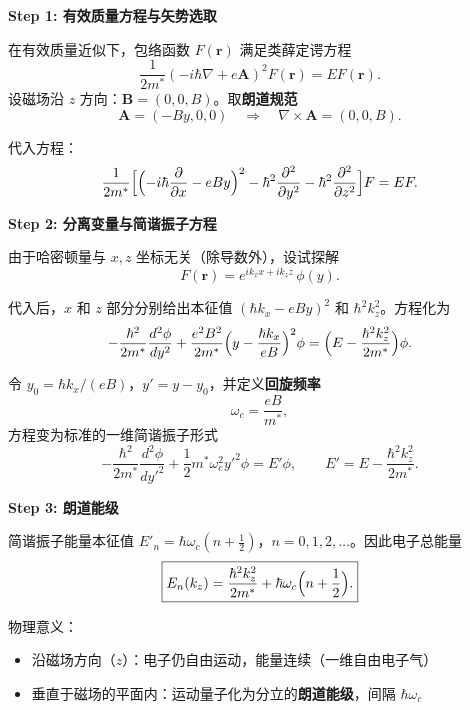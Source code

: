 \begin{derivationbox}[标准解题过程]
\textbf{Step 1: 有效质量方程与矢势选取}

在有效质量近似下，包络函数 $F(\bm{r})$ 满足类薛定谔方程
\begin{equation}
\frac{1}{2m^*}(-i\hbar\nabla+e\bm{A})^2F(\bm{r})=EF(\bm{r}).
\end{equation}
设磁场沿 $z$ 方向：$\bm{B}=(0,0,B)$。取\textbf{朗道规范}
\begin{equation}
\bm{A}=(-By,0,0)\quad\Longrightarrow\quad\nabla\times\bm{A}=(0,0,B).
\end{equation}

代入方程：
\begin{equation}
\frac{1}{2m^*}\Bigl[\Bigl(-i\hbar\frac{\partial}{\partial x}-eBy\Bigr)^2-\hbar^2\frac{\partial^2}{\partial y^2}-\hbar^2\frac{\partial^2}{\partial z^2}\Bigr]F=EF.
\end{equation}

\textbf{Step 2: 分离变量与简谐振子方程}

由于哈密顿量与 $x,z$ 坐标无关（除导数外），设试探解
\begin{equation}
F(\bm{r})=e^{ik_xx+ik_zz}\,\phi(y).
\end{equation}

代入后，$x$ 和 $z$ 部分分别给出本征值 $(\hbar k_x-eBy)^2$ 和 $\hbar^2k_z^2$。方程化为
\begin{equation}
-\frac{\hbar^2}{2m^*}\frac{d^2\phi}{dy^2}+\frac{e^2B^2}{2m^*}\Bigl(y-\frac{\hbar k_x}{eB}\Bigr)^2\phi=\Bigl(E-\frac{\hbar^2k_z^2}{2m^*}\Bigr)\phi.
\end{equation}

令 $y_0=\hbar k_x/(eB)$，$y'=y-y_0$，并定义\textbf{回旋频率}
\begin{equation}
\omega_c=\frac{eB}{m^*},
\end{equation}
方程变为标准的一维简谐振子形式
\begin{equation}
-\frac{\hbar^2}{2m^*}\frac{d^2\phi}{dy'^2}+\frac12m^*\omega_c^2y'^2\phi=E'\phi,
\qquad E'=E-\frac{\hbar^2k_z^2}{2m^*}.
\end{equation}

\textbf{Step 3: 朗道能级}

简谐振子能量本征值 $E'_n=\hbar\omega_c(n+\tfrac12)$，$n=0,1,2,\ldots$。因此电子总能量
\begin{equation}
\boxed{E_n(k_z)=\frac{\hbar^2k_z^2}{2m^*}+\hbar\omega_c\Bigl(n+\frac12\Bigr).}
\end{equation}

物理意义：
\begin{itemize}
    \item 沿磁场方向（$z$）：电子仍自由运动，能量连续（一维自由电子气）
    \item 垂直于磁场的平面内：运动量子化为分立的\textbf{朗道能级}，间隔 $\hbar\omega_c$
\end{itemize}


\end{derivationbox}
